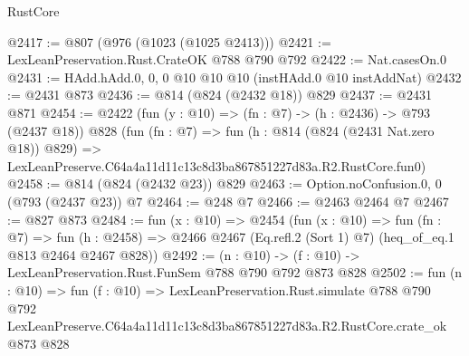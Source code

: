 \begin{lexlean}{RustCore}
\begin{coremodule}
@2417 := @807 (@976 (@1023 (@1025 @2413)))
@2421 := LexLeanPreservation.Rust.CrateOK @788 @790 @792
@2422 := Nat.casesOn.{0}
@2431 := HAdd.hAdd.{0, 0, 0} @10 @10 @10 (instHAdd.{0} @10 instAddNat)
@2432 := @2431 @873
@2436 := @814 (@824 (@2432 @18)) @829
@2437 := @2431 @871
@2454 := @2422
    (fun (y : @10) => (fn : @7) -> (h : @2436) -> @793 (@2437 @18))
    @828
    (fun (fn : @7) =>
    fun (h : @814 (@824 (@2431 Nat.zero @18)) @829) =>
    LexLeanPreserve.C64a4a11d11c13c8d3ba867851227d83a.R2.RustCore.fun0)
@2458 := @814 (@824 (@2432 @23)) @829
@2463 := Option.noConfusion.{0, 0} (@793 (@2437 @23)) @7
@2464 := @248 @7
@2466 := @2463 @2464 @7
@2467 := @827 @873
@2484 := fun (x : @10) =>
  @2454
    (fun (x : @10) =>
    fun (fn : @7) =>
    fun (h : @2458) => @2466 @2467 (Eq.refl.{2} (Sort 1) @7) (heq_of_eq.{1} @813 @2464 @2467 @828))
@2492 := (n : @10) -> (f : @10) -> LexLeanPreservation.Rust.FunSem @788 @790 @792 @873 @828
@2502 := fun (n : @10) =>
  fun (f : @10) =>
  LexLeanPreservation.Rust.simulate
    @788
    @790
    @792
    LexLeanPreserve.C64a4a11d11c13c8d3ba867851227d83a.R2.RustCore.crate_ok
    @873
    @828
\end{coremodule}
\end{lexlean}
